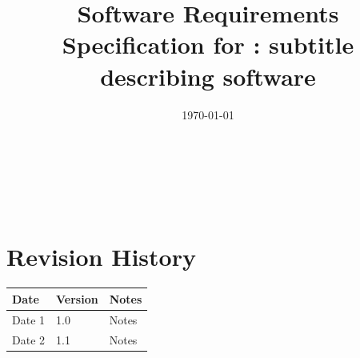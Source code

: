 \documentclass[12pt]{article}
\begin{document}
\title{Software Requirements Specification for \progname: subtitle describing software} 
\author{\authname}
\date{\today}
	
\maketitle

~\newpage


\tableofcontents

~\newpage

\section{Revision History}

\begin{tabularx}{\textwidth}{p{3cm}p{2cm}X}
\toprule {\bf Date} & {\bf Version} & {\bf Notes}\\
\midrule
Date 1 & 1.0 & Notes\\
Date 2 & 1.1 & Notes\\
\bottomrule
\end{tabularx}

~\newpage





\end{document}
